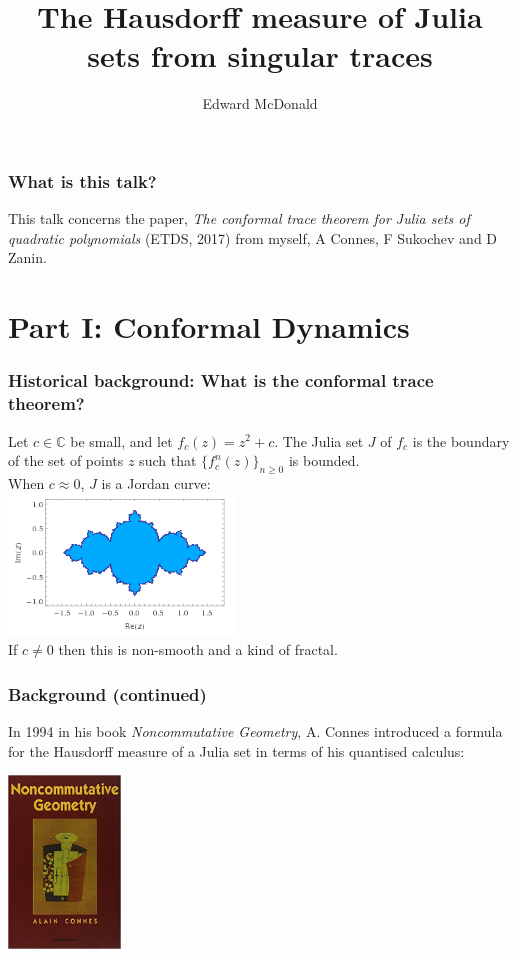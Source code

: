 \documentclass{beamer} %
\title{The Hausdorff measure of Julia sets from singular traces}
\author{Edward McDonald}
\institute{UNSW}
\theoremstyle{definition} %
\newcommand{\Cplx}{\mathbb{C}}
\def\qd{\,{\mathchar'26\mkern-12mu d}}
\begin{document}
\begin{frame} 
\titlepage
\end{frame}

\begin{frame}\frametitle{What is this talk?}
    This talk concerns the paper, 
    \emph{ The conformal trace theorem for Julia sets of quadratic polynomials}
    (ETDS, 2017) from myself, A Connes, F Sukochev and D Zanin.
\end{frame}



\section{Part I: Conformal Dynamics}

\begin{frame}\frametitle{Historical background: What is the conformal trace theorem?}
    Let $c \in \Cplx$ be small, and let $f_c(z) = z^2+c$. The Julia set $J$ of $f_c$ is the boundary of the set of points $z$ such that $\{f_c^n(z)\}_{n\geq 0}$ is bounded.\\
    When $c \approx 0$, $J$ is a Jordan curve:\\
    \includegraphics[width=60mm]{img/julia-07001-filled.png}\\
    If $c \neq 0$ then this is non-smooth and a kind of fractal.
\end{frame}

\begin{frame}\frametitle{Background (continued)}
    In 1994 in his book {\it Noncommutative Geometry}, A. Connes introduced a formula for the Hausdorff measure of a Julia set in terms of his quantised calculus:
    \begin{center}
    \includegraphics[width=30mm]{img/ncg-book-cover.jpg}
    \end{center}
\end{frame}
\end{document}
